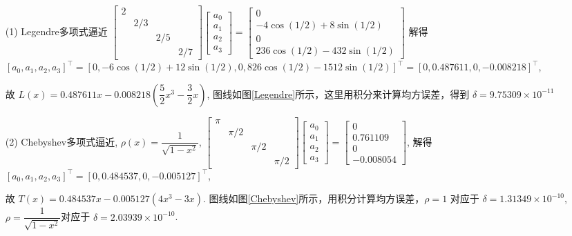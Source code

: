\documentclass{article}
\begin{document}
\begin{spacing}{1.5}
\begin{itemize}
    \begin{itemize}
        \item [(1)] Legendre多项式逼近 $\left[\begin{array}{cccc}2&&&\\&2/3&&\\&&2/5&\\&&&2/7\end{array}\right]\left[\begin{array}{c}a_0\\a_1\\a_2\\a_3\end{array}\right] = \left[\begin{array}{c}0\\-4\cos (1/2)+8 \sin (1/2) \\ 0 \\ 236\cos (1/2) - 432 \sin (1/2)\end{array}\right]$ 解得 $[a_0, a_1, a_2, a_3]^\top = [0, -6\cos(1/2)+12\sin(1/2), 0, 826\cos(1/2) - 1512\sin(1/2)]^\top = [0, 0.487611, 0, -0.008218]^\top$, 
        
        故 $L(x) = 0.487611 x - 0.008218\left(\dfrac{5}{2}x^3 - \dfrac{3}{2}x\right)$, 图线如图\ref{Legendre}所示，这里用积分来计算均方误差，得到 $\delta = 9.75309\times 10^{-11}$
        
        \item [(2)] Chebyshev多项式逼近, $\rho(x)=\dfrac{1}{\sqrt{1-x^2}}$, $\left[\begin{array}{cccc}\pi&&&\\&\pi/2&&\\&&\pi/2&\\&&&\pi/2\end{array}\right]\left[\begin{array}{c}a_0\\a_1\\a_2\\a_3\end{array}\right] = \left[\begin{array}{c}0\\0.761109\\0\\-0.008054\end{array}\right]$, 解得 $[a_0,a_1,a_2,a_3]^\top = [0,0.484537,0,-0.005127]^\top$, 
        
        故 $T(x)=0.484537x-0.005127(4x^3-3x)$. 图线如图\ref{Chebyshev}所示，用积分计算均方误差，$\rho=1$ 对应于 $\delta=1.31349\times 10^{-10}$, $\rho=\dfrac{1}{\sqrt{1-x^2}}$对应于 $\delta=2.03939\times 10^{-10}$.
        

\end{itemize}
\end{itemize}
\end{spacing}
\end{document}
